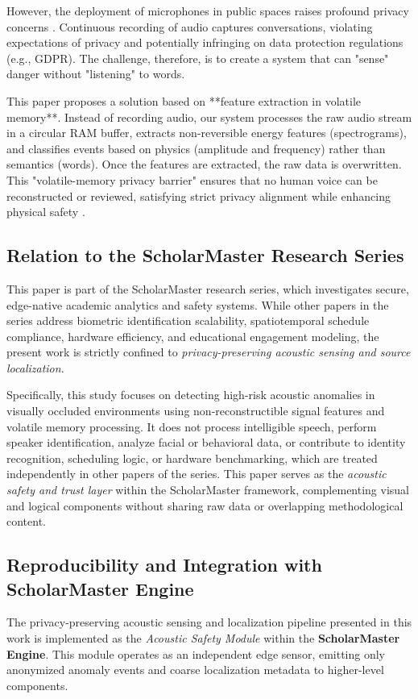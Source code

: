 \documentclass[conference]{IEEEtran}
\begin{document}
However, the deployment of microphones in public spaces raises profound privacy concerns \cite{b1}. Continuous recording of audio captures conversations, violating expectations of privacy and potentially infringing on data protection regulations (e.g., GDPR). The challenge, therefore, is to create a system that can "sense" danger without "listening" to words.

This paper proposes a solution based on **feature extraction in volatile memory**. Instead of recording audio, our system processes the raw audio stream in a circular RAM buffer, extracts non-reversible energy features (spectrograms), and classifies events based on physics (amplitude and frequency) rather than semantics (words). Once the features are extracted, the raw data is overwritten. This "volatile-memory privacy barrier" ensures that no human voice can be reconstructed or reviewed, satisfying strict privacy alignment while enhancing physical safety \cite{b24}.

\subsection{Relation to the ScholarMaster Research Series}
This paper is part of the ScholarMaster research series, which investigates secure, edge-native academic analytics and safety systems. While other papers in the series address biometric identification scalability, spatiotemporal schedule compliance, hardware efficiency, and educational engagement modeling, the present work is strictly confined to \textit{privacy-preserving acoustic sensing and source localization}.

Specifically, this study focuses on detecting high-risk acoustic anomalies in visually occluded environments using non-reconstructible signal features and volatile memory processing. It does not process intelligible speech, perform speaker identification, analyze facial or behavioral data, or contribute to identity recognition, scheduling logic, or hardware benchmarking, which are treated independently in other papers of the series. This paper serves as the \textit{acoustic safety and trust layer} within the ScholarMaster framework, complementing visual and logical components without sharing raw data or overlapping methodological content.

\subsection{Reproducibility and Integration with ScholarMaster Engine}
The privacy-preserving acoustic sensing and localization pipeline presented in this work is implemented as the \textit{Acoustic Safety Module} within the \textbf{ScholarMaster Engine}. This module operates as an independent edge sensor, emitting only anonymized anomaly events and coarse localization metadata to higher-level components.
\end{document}
